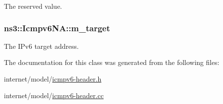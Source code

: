 The reserved value. 

\subsubsection[{\texorpdfstring{m\+\_\+target}{m_target}}]{ ns3\+::\+Icmpv6\+N\+A\+::m\+\_\+target\hspace{0.3cm}{\ttfamily [private]}}\hypertarget{classns3_1_1Icmpv6NA_ad37f044bb91453c07425db84e6bcedb6}{}\label{classns3_1_1Icmpv6NA_ad37f044bb91453c07425db84e6bcedb6}


The I\+Pv6 target address. 



The documentation for this class was generated from the following files\+:\begin{DoxyCompactItemize}
\item 
internet/model/\hyperlink{icmpv6-header_8h}{icmpv6-\/header.\+h}\item 
internet/model/\hyperlink{icmpv6-header_8cc}{icmpv6-\/header.\+cc}\end{DoxyCompactItemize}
